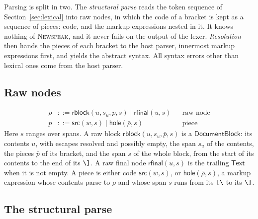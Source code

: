 \documentclass[11pt]{article}
\numberwithin{equation}{section}
\newcommand{\NS}{\textsc{Newspeak}}
\newcommand{\kw}[1]{\ensuremath{\mathsf{#1}}}
\newcommand{\str}[1]{\ensuremath{\text{\texttt{#1}}}}
\newcommand{\bs}{\textbackslash}
\newcommand{\Open}{\str{[\bs}}
\newcommand{\Close}{\str{\bs]}}
\begin{document}
Parsing is split in two.  The \emph{structural parse} reads the token
sequence of Section~\ref{sec:lexical} into raw nodes, in which the code of a
bracket is kept as a sequence of pieces: code, and the markup expressions
nested in it.  It knows nothing of \NS, and it never fails on the output of
the lexer.  \emph{Resolution} then hands the pieces of each bracket to the
host parser, innermost markup expressions first, and yields the abstract
syntax.  All syntax errors other than lexical ones come from the host
parser.

\subsection{Raw nodes}

\begin{equation}\label{eq:raw-nodes}
\begin{aligned}
\rho &::= \kw{rblock}(u, s_u, \bar p, s) \mid \kw{rfinal}(u, s)
  && \text{raw node} \\
p &::= \kw{src}(w, s) \mid \kw{hole}(\bar\rho, s)
  && \text{piece}
\end{aligned}
\end{equation}
Here $s$ ranges over spans.  A raw block $\kw{rblock}(u, s_u, \bar p, s)$ is
a $\kw{DocumentBlock}$: its contents $u$, with escapes resolved and possibly
empty, the span $s_u$ of the contents, the pieces $\bar p$ of its bracket,
and the span $s$ of the whole block, from the start of its contents to the
end of its $\Close$.  A raw final node $\kw{rfinal}(u, s)$ is the trailing
$\kw{Text}$ when it is not empty.  A piece is either code $\kw{src}(w, s)$,
or $\kw{hole}(\bar\rho, s)$, a markup expression whose contents parse to
$\bar\rho$ and whose span $s$ runs from its $\Open$ to its $\Close$.

\subsection{The structural parse}
\end{document}
